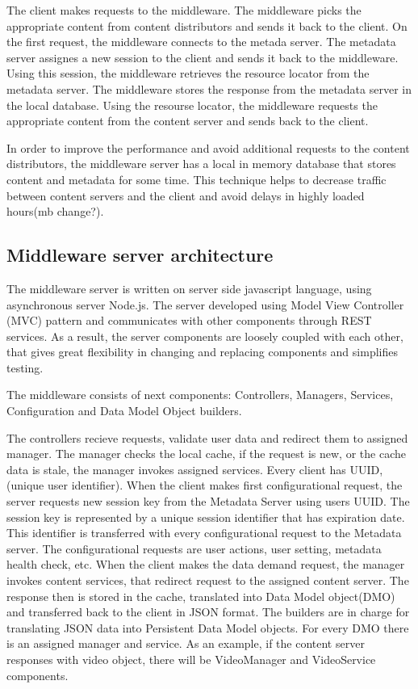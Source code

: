 The client makes requests to the middleware. The middleware picks the appropriate content from content distributors and sends it back to the client. On the first request, the middleware connects to the metada server. The metadata server assignes a new session to the client and sends it back to the middleware. Using this session, the middleware retrieves the resource locator from the metadata server. The middleware stores the response from the metadata server in the local database. Using the resourse locator, the middleware requests the appropriate content from the content server and sends back to the client.

In order to improve the performance and avoid additional requests to the content distributors, the middleware server has a local in memory database that stores content and metadata for some time. This technique helps to decrease traffic between content servers and the client and avoid delays in highly loaded hours(mb change?).  

\subsection{Middleware server architecture}

The middleware server is written on server side javascript language, using asynchronous server Node.js. The server developed using Model View Controller (MVC) pattern and communicates with other components through REST services. As a result, the server components are loosely coupled with each other, that gives great flexibility in changing and replacing components and simplifies testing. 

The middleware consists of next components: Controllers, Managers, Services, Configuration and Data Model Object builders. 

The controllers recieve requests, validate user data and redirect them to assigned manager. The manager checks the local cache, if the request is new, or the cache data is stale, the manager invokes assigned services. Every client has UUID,(unique user identifier). When the client makes first configurational request, the server requests new session key from the Metadata Server using users UUID. The session key is represented by a unique session identifier that has expiration date. This identifier is transferred with every configurational request to the Metadata server. The configurational requests are user actions, user setting, metadata health check, etc. When the client makes the data demand request, the manager invokes content services, that redirect request to the assigned content server. The response then is stored in the cache, translated into Data Model object(DMO) and transferred back to the client in JSON format. The builders are in charge for translating JSON data into Persistent Data Model objects. For every DMO there is an assigned manager and service. As an example, if the content server responses with video object, there will be VideoManager and VideoService components.   

